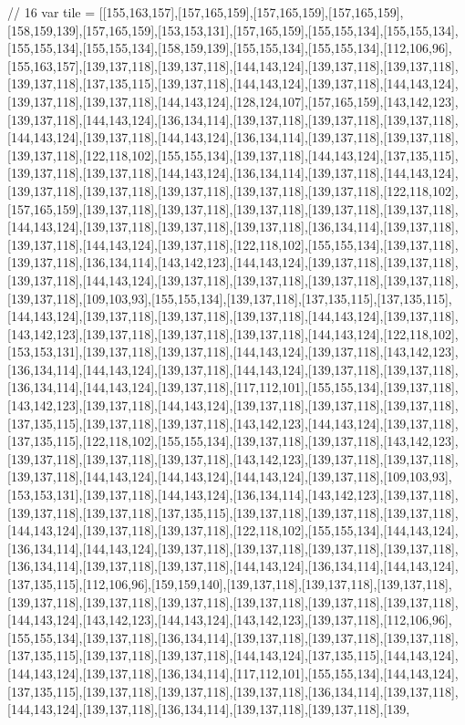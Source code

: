 // 16
var tile = [[155,163,157],[157,165,159],[157,165,159],[157,165,159],[158,159,139],[157,165,159],[153,153,131],[157,165,159],[155,155,134],[155,155,134],[155,155,134],[155,155,134],[158,159,139],[155,155,134],[155,155,134],[112,106,96],[155,163,157],[139,137,118],[139,137,118],[144,143,124],[139,137,118],[139,137,118],[139,137,118],[137,135,115],[139,137,118],[144,143,124],[139,137,118],[144,143,124],[139,137,118],[139,137,118],[144,143,124],[128,124,107],[157,165,159],[143,142,123],[139,137,118],[144,143,124],[136,134,114],[139,137,118],[139,137,118],[139,137,118],[144,143,124],[139,137,118],[144,143,124],[136,134,114],[139,137,118],[139,137,118],[139,137,118],[122,118,102],[155,155,134],[139,137,118],[144,143,124],[137,135,115],[139,137,118],[139,137,118],[144,143,124],[136,134,114],[139,137,118],[144,143,124],[139,137,118],[139,137,118],[139,137,118],[139,137,118],[139,137,118],[122,118,102],[157,165,159],[139,137,118],[139,137,118],[139,137,118],[139,137,118],[139,137,118],[144,143,124],[139,137,118],[139,137,118],[139,137,118],[136,134,114],[139,137,118],[139,137,118],[144,143,124],[139,137,118],[122,118,102],[155,155,134],[139,137,118],[139,137,118],[136,134,114],[143,142,123],[144,143,124],[139,137,118],[139,137,118],[139,137,118],[144,143,124],[139,137,118],[139,137,118],[139,137,118],[139,137,118],[139,137,118],[109,103,93],[155,155,134],[139,137,118],[137,135,115],[137,135,115],[144,143,124],[139,137,118],[139,137,118],[139,137,118],[144,143,124],[139,137,118],[143,142,123],[139,137,118],[139,137,118],[139,137,118],[144,143,124],[122,118,102],[153,153,131],[139,137,118],[139,137,118],[144,143,124],[139,137,118],[143,142,123],[136,134,114],[144,143,124],[139,137,118],[144,143,124],[139,137,118],[139,137,118],[136,134,114],[144,143,124],[139,137,118],[117,112,101],[155,155,134],[139,137,118],[143,142,123],[139,137,118],[144,143,124],[139,137,118],[139,137,118],[139,137,118],[137,135,115],[139,137,118],[139,137,118],[143,142,123],[144,143,124],[139,137,118],[137,135,115],[122,118,102],[155,155,134],[139,137,118],[139,137,118],[143,142,123],[139,137,118],[139,137,118],[139,137,118],[143,142,123],[139,137,118],[139,137,118],[139,137,118],[144,143,124],[144,143,124],[144,143,124],[139,137,118],[109,103,93],[153,153,131],[139,137,118],[144,143,124],[136,134,114],[143,142,123],[139,137,118],[139,137,118],[139,137,118],[137,135,115],[139,137,118],[139,137,118],[139,137,118],[144,143,124],[139,137,118],[139,137,118],[122,118,102],[155,155,134],[144,143,124],[136,134,114],[144,143,124],[139,137,118],[139,137,118],[139,137,118],[139,137,118],[136,134,114],[139,137,118],[139,137,118],[144,143,124],[136,134,114],[144,143,124],[137,135,115],[112,106,96],[159,159,140],[139,137,118],[139,137,118],[139,137,118],[139,137,118],[139,137,118],[139,137,118],[139,137,118],[139,137,118],[139,137,118],[144,143,124],[143,142,123],[144,143,124],[143,142,123],[139,137,118],[112,106,96],[155,155,134],[139,137,118],[136,134,114],[139,137,118],[139,137,118],[139,137,118],[137,135,115],[139,137,118],[139,137,118],[144,143,124],[137,135,115],[144,143,124],[144,143,124],[139,137,118],[136,134,114],[117,112,101],[155,155,134],[144,143,124],[137,135,115],[139,137,118],[139,137,118],[139,137,118],[136,134,114],[139,137,118],[144,143,124],[139,137,118],[136,134,114],[139,137,118],[139,137,118],[139,